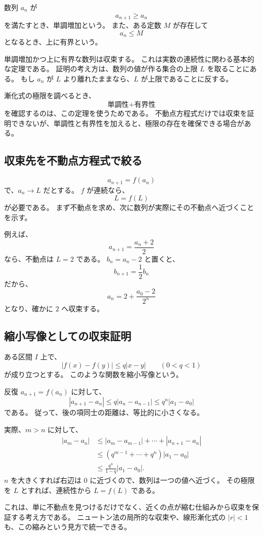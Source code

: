 数列 $a_n$ が
\[
  a_{n+1}\geq a_n
\]
を満たすとき、単調増加という。
また、ある定数 $M$ が存在して
\[
  a_n\leq M
\]
となるとき、上に有界という。

単調増加かつ上に有界な数列は収束する。
これは実数の連続性に関わる基本的な定理である。
証明の考え方は、数列の値が作る集合の上限 $L$ を取ることにある。
もし $a_n$ が $L$ より離れたままなら、$L$ が上限であることに反する。

漸化式の極限を調べるとき、
\[
  \text{単調性}+\text{有界性}
\]
を確認するのは、この定理を使うためである。
不動点方程式だけでは収束を証明できないが、単調性と有界性を加えると、極限の存在を確保できる場合がある。

\subsection{収束先を不動点方程式で絞る}

\[
  a_{n+1}=f(a_n)
\]
で、$a_n\to L$ だとする。
$f$ が連続なら、
\[
  L=f(L)
\]
が必要である。
まず不動点を求め、次に数列が実際にその不動点へ近づくことを示す。

例えば、
\[
  a_{n+1}=\frac{a_n+2}{2}
\]
なら、不動点は $L=2$ である。
$b_n=a_n-2$ と置くと、
\[
  b_{n+1}=\frac12b_n
\]
だから、
\[
  a_n=2+\frac{a_0-2}{2^n}
\]
となり、確かに $2$ へ収束する。

\subsection{縮小写像としての収束証明}

ある区間 $I$ 上で、
\[
  |f(x)-f(y)|\leq q|x-y|
  \qquad(0<q<1)
\]
が成り立つとする。
このような関数を縮小写像という。

反復 $a_{n+1}=f(a_n)$ に対して、
\[
  |a_{n+1}-a_n|
  \leq q|a_n-a_{n-1}|
  \leq q^n|a_1-a_0|
\]
である。
従って、後の項同士の距離は、等比的に小さくなる。

実際、$m>n$ に対して、
\[
\begin{aligned}
  |a_m-a_n|
  &\leq
  |a_m-a_{m-1}|+\cdots+|a_{n+1}-a_n|\\
  &\leq
  (q^{m-1}+\cdots+q^n)|a_1-a_0|\\
  &\leq
  \frac{q^n}{1-q}|a_1-a_0|.
\end{aligned}
\]
$n$ を大きくすれば右辺は $0$ に近づくので、数列は一つの値へ近づく。
その極限を $L$ とすれば、連続性から $L=f(L)$ である。

これは、単に不動点を見つけるだけでなく、近くの点が縮む仕組みから収束を保証する考え方である。
ニュートン法の局所的な収束や、線形漸化式の $|r|<1$ も、この縮みという見方で統一できる。

